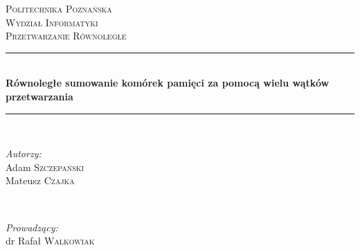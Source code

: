 \begin{titlepage}

\newcommand{\HRule}{\rule{\linewidth}{0.5mm}} %

\center %
 

\textsc{\LARGE Politechnika Poznańska}\\[1.5cm] %
\textsc{\Large Wydział Informatyki}\\[0.5cm] %
\textsc{\large Przetwarzanie Równoległe}\\[0.5cm] %


\HRule \\[0.4cm]
{ \huge \bfseries Równoległe sumowanie komórek pamięci za pomocą wielu wątków przetwarzania}\\[0.4cm] %
\HRule \\[1.5cm]
 

\begin{minipage}[t]{0.4\textwidth}
\begin{flushleft} \large
\emph{Autorzy:}\\
Adam \textsc{Szczepański} \\
Mateusz \textsc{Czajka} %
\end{flushleft}
\end{minipage}
~
\begin{minipage}[t]{0.4\textwidth}
\begin{flushright} \large
\emph{Prowadzący:} \\
dr Rafał \textsc{Walkowiak} %
\end{flushright}
\end{minipage}\\[2cm]


\end{titlepage}
